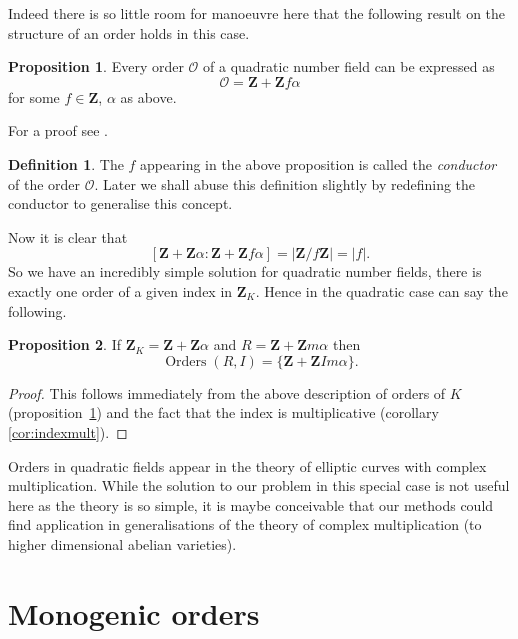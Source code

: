 \documentclass[12pt,a4paper,abstracton,bibtotoc]{scrreprt}
\theoremstyle{definition}
\newtheorem{prop}{Proposition}
\newtheorem{defn}{Definition}
\newcommand{\ZZ}{\mathbf{Z}}
\renewcommand{\O}{\mathcal{O}}
\DeclareMathOperator{\Orders}{Orders}
\begin{document}
Indeed there is so little room for manoeuvre here that the following result on the structure of an order holds in this case.

\begin{prop}
\label{prop:quadord}
Every order $\O$ of a quadratic number field can be expressed as
\[\O = \ZZ + \ZZ f\alpha\]
for some $f\in \ZZ$, $\alpha$ as above.
\end{prop}

For a proof see \cite[pp. 133--134]{cox}.

\begin{defn}
The $f$ appearing in the above proposition is called the \emph{conductor} of the order $\O$.
Later we shall abuse this definition slightly by redefining the conductor to generalise this concept.
\end{defn}

Now it is clear that
\[
[\ZZ + \ZZ\alpha : \ZZ + \ZZ f \alpha] = |\ZZ/f\ZZ| = |f|.
\]
So we have an incredibly simple solution for quadratic number fields, there is exactly one order of a given index in $\ZZ_K$.
Hence in the quadratic case can say the following.

\begin{prop}
If $\ZZ_K = \ZZ + \ZZ\alpha$ and $R = \ZZ + \ZZ m\alpha$ then
\[
\Orders(R, I) = \{\ZZ + \ZZ Im\alpha\}.
\]
\end{prop}
\begin{proof}
This follows immediately from the above description of orders of $K$ (proposition~\ref{prop:quadord}) and the fact that the index is multiplicative (corollary \ref{cor:indexmult}).
\end{proof}

Orders in quadratic fields appear in the theory of elliptic curves with complex multiplication.
While the solution to our problem in this special case is not useful here as the theory is so simple, it is maybe conceivable that our methods could find application in generalisations of the theory of complex multiplication (to higher dimensional abelian varieties).


\section{Monogenic orders}
\end{document}
